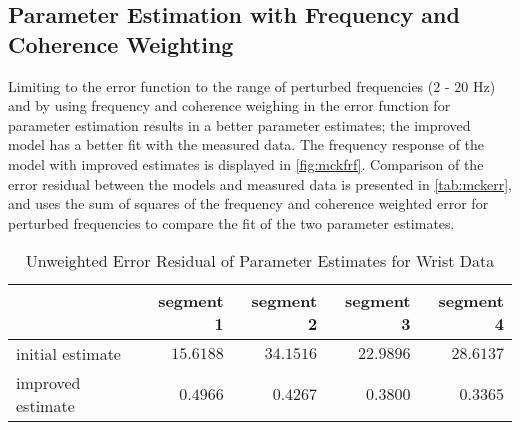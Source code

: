 \documentclass[11pt,a4paper]{article}
\begin{document}
\subsection{Parameter Estimation with Frequency and Coherence Weighting}
Limiting to the error function to the range of perturbed frequencies ($2$ -
$20$ Hz) and by using frequency and coherence weighing in the error function
for parameter estimation results in a better parameter estimates; the improved
model has a better fit with the measured data. The frequency response of the
model with improved estimates is displayed in \autoref{fig:mckfrf}. Comparison
of the error residual between the models and measured data is presented in
\autoref{tab:mckerr}, and uses the sum of squares of the frequency and
coherence weighted error for perturbed frequencies to compare the fit of the
two parameter estimates.

\begin{table}
    \centering
    \begin{tabular}{|l|r|r|r|r|}
        \hline
        \nonumber & segment 1 & segment 2 & segment 3 & segment 4 \\
        \hline
        initial estimate & $15.6188$ & $34.1516$ & $22.9896$ & $28.6137$ \\
        improved estimate & $0.4966$ & $0.4267$ & $0.3800$ & $0.3365$ \\
        \hline
    \end{tabular}
    \caption{Unweighted Error Residual of Parameter Estimates for Wrist Data}
    \label{tab:mckerr}
\end{table}

\end{document}
